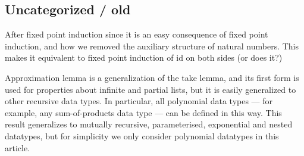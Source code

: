 \subsection{Uncategorized / old}

After fixed point induction since it is an easy consequence of fixed
point induction, and how we removed the auxiliary structure of natural
numbers. This makes it equivalent to fixed point induction of id on
both sides (or does it?)

Approximation lemma is a generalization of the take lemma, and its
first form is used for properties about infinite and partial lists,
but it is easily generalized to other recursive data types.
In particular, all polynomial data types — for example, any
sum-of-products data type — can be defined in this way.
This result generalizes
to mutually recursive, parameterised, exponential and nested datatypes, but
for simplicity we only consider polynomial datatypes in this article.
\cite{genapprox}

